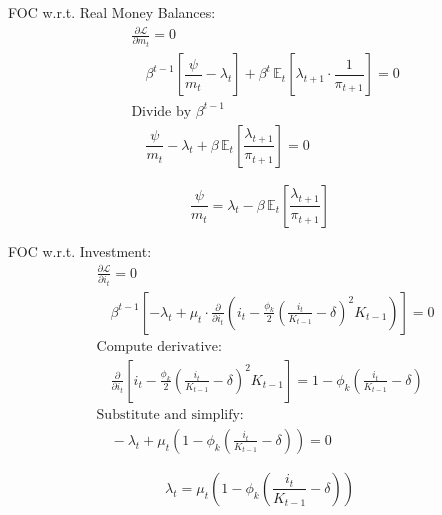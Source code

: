\documentclass[11pt,preprint]{elsarticle}
\numberwithin{equation}{section}
\numberwithin{figure}{section}
\numberwithin{table}{section}
\begin{document}
FOC w.r.t. Real Money Balances: \begin{align*}
  & \frac{\partial \mathcal{L}}{\partial m_t} = 0 \\
  & \quad \beta^{t-1} \left[ \dfrac{\psi}{m_t} - \lambda_t \right] + \beta^{t} \, \mathbb{E}_t \left[ \lambda_{t+1} \cdot \dfrac{1}{\pi_{t+1}} \right] = 0 \\[6pt]
  & \text{Divide by } \beta^{t-1} \\
  & \quad \dfrac{\psi}{m_t} - \lambda_t + \beta \, \mathbb{E}_t \left[ \dfrac{\lambda_{t+1}}{\pi_{t+1}} \right] = 0
\end{align*}

\begin{equation}\label{foc_M_app}
\boxed{\dfrac{\psi}{m_t} = \lambda_t - \beta \, \mathbb{E}_t \left[ \dfrac{\lambda_{t+1}}{\pi_{t+1}} \right]}
\end{equation}

FOC w.r.t. Investment: \begin{align*}
  & \frac{\partial \mathcal{L}}{\partial i_t} = 0 \\
  & \quad \beta^{t-1} \left[ -\lambda_t + \mu_t \cdot \frac{\partial}{\partial i_t} \left( i_t - \frac{\phi_k}{2} \left( \frac{i_t}{K_{t-1}} - \delta \right)^2 K_{t-1} \right) \right] = 0 \\[6pt]
  & \text{Compute derivative:} \\
  & \quad \frac{\partial}{\partial i_t} \left[ i_t - \frac{\phi_k}{2} \left( \frac{i_t}{K_{t-1}} - \delta \right)^2 K_{t-1} \right] = 1 - \phi_k \left( \frac{i_t}{K_{t-1}} - \delta \right) \\[6pt]
  & \text{Substitute and simplify:} \\
  & \quad -\lambda_t + \mu_t \left( 1 - \phi_k \left( \frac{i_t}{K_{t-1}} - \delta \right) \right) = 0
\end{align*}

\begin{equation}\label{foc_I_app}
\boxed{\lambda_t = \mu_t \left( 1 - \phi_k \left( \frac{i_t}{K_{t-1}} - \delta \right) \right)}
\end{equation}
\end{document}
